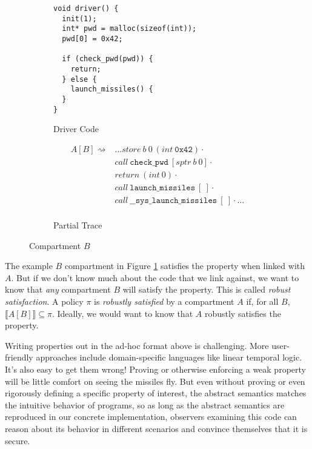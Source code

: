 \documentclass{article}
\begin{document}
\begin{figure}
  \begin{subfigure}{0.5\textwidth}
\begin{verbatim}
void driver() {
  init(1);
  int* pwd = malloc(sizeof(int));
  pwd[0] = 0x42;

  if (check_pwd(pwd)) {
    return;
  } else {
    launch_missiles() {
  }
}
\end{verbatim}
    \caption{Driver Code}
  \end{subfigure}
  \begin{subfigure}{0.5\textwidth}
    \[\begin{split}
    A[B] \rightsquigarrow & \ldots \mathit{store} ~ b ~ 0 ~ (\mathit{int} ~ \mathtt{0x42}) \cdot \\
    & \mathit{call} ~ \mathtt{check\_pwd} ~ [\mathit{sptr} ~ b ~ 0] \cdot \\
    & \mathit{return} ~ (\mathit{int} ~ 0) \cdot \\
    & \mathit{call} ~ \mathtt{launch\_missiles} ~ [~] \cdot \\
    & \mathit{call} ~ \mathtt{\_\_sys\_launch\_missiles} ~ [~] \cdot \ldots \\
    \end{split}\]
    \caption{Partial Trace}
  \end{subfigure}

\caption{Compartment \(B\)}
\label{fig:ex_traces}
\end{figure}

The example \(B\) compartment in Figure \ref{fig:ex_traces} satisfies the property when linked with
\(A\). But if we don't know much about the code that we link against, we want to know that {\em any}
compartment \(B\) will satisfy the property. This is called {\em robust satisfaction}.
A policy \(\pi\) is {\em robustly satisfied} by a compartment \(A\) if, for all \(B\),
\(\llbracket A[B] \rrbracket \subseteq \pi\). Ideally, we would want to know that \(A\)
robustly satisfies the property.

Writing properties out in the ad-hoc format above is challenging. More user-friendly approaches include
domain-specific languages like linear temporal logic. It's also easy to get them wrong!
Proving or otherwise enforcing a weak property will be little comfort on seeing the missiles fly.
But even without proving or even rigorously defining a specific property of interest,
the abstract semantics matches the intuitive behavior of programs, so as long as the abstract
semantics are reproduced in our concrete implementation, observers examining this
code can reason about its behavior in different scenarios and convince themselves that it is secure.
\end{document}
